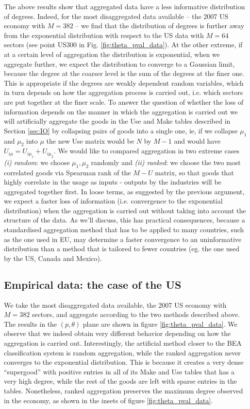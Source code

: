 The above results show that aggregated data have a less informative
distribution of degrees. Indeed, for the most disaggregated data
available -- the 2007 US economy with $M=382$ -- we find that the
distribution of degrees is further away from the exponential
distribution with respect to the US data with $M=64$ sectors (see
point US300 in Fig. \ref{fig:theta_pval_data}).  At the other extreme,
if at a certain level of aggregation the distribution is exponential,
when we aggregate further, we expect the distribution to converge to a
Gaussian limit, because the degree at the coarser level is the sum of
the degrees at the finer one. This is appropriate if the degrees are
weakly dependent random variables, which in turn depends on how the
aggregation process is carried out, i.e. which sectors are put
together at the finer scale.  To answer the question of whether the
loss of information depends on the manner in which the aggregation is
carried out we will artificially aggregate the goods in the Use and Make tables
described in Section \ref{sec:IO} by collapsing pairs of goods into a
single one, ie, if we collapse $\mu_1$ and $\mu_2$ into $\mu$ the new
Use matrix would be $N$ by $M-1$ and would have $U_{i\mu} = U_{i\mu_1}
+ U_{i\mu_2}$. We would like to compared aggregation in two extreme
cases \emph{(i) random}: we choose $\mu_1, \mu_2$ randomly and
\emph{(ii) ranked}: we choose the two most correlated goods via
Spearman rank of the $M - U$ matrix, so that goods that highly
correlate in the usage as inputs - outputs by the industries will be
aggregated together first. In loose terms, as suggested by the
previous argument, we expect a faster loss of information
(i.e. convergence to the exponential distribution) when the
aggregation is carried out without taking into account the structure
of the data. As we'll discuss, this has practical consequences,
because a standardised aggregation method that has to be applied to
many countries, such as the one used in EU, may determine a faster
convergence to an uninformative distribution than a method that is
tailored to fewer countries (eg. the one used by the US, Canada and
Mexico).

\subsection{Empirical data: the case of the US}

We take the most disaggregated data available, the 2007 US economy
with $M=382$ sectors, and aggregate according to the two methods
described above.  The results in the $(p, \theta)$ plane
are shown in figure \ref{fig:theta_pval_data}. We observe that we indeed obtain very different behavior depending on how the aggregation is carried out. Interestingly, the artificial method closer to the BEA classification system is random aggregation, while the ranked aggregation never converges to the exponential distribution. This is
because it creates a very dense ``supergood'' with positive entries in
all of its Make and Use tables that has a very high degree, while the
rest of the goods are left with sparse entries in the
tables. Nonetheless, ranked aggregation preserves the maximum degree
observed in the economy, as shown in the insets of figure
\ref{fig:theta_pval_data}.

